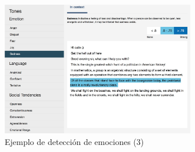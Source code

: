 \documentclass[compress]{beamer}
\begin{document}
\begin{frame}
	\begin{figure}[H]
		\centering
		\label{sadness.jpg}
		\includegraphics[width=0.75\textwidth]{./Imagenes/sadness.jpeg}
		\caption{Ejemplo de detección de emociones (3)}
	\end{figure}
\end{frame}
\end{document}
